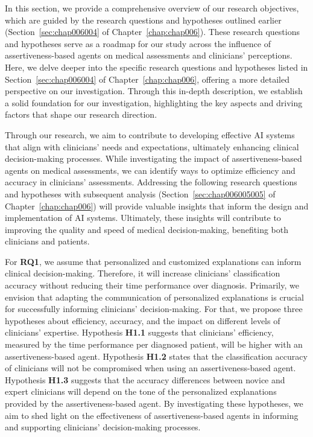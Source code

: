 In this section, we provide a comprehensive overview of our research objectives, which are guided by the research questions and hypotheses outlined earlier (Section~\ref{sec:chap006004} of Chapter~\ref{chap:chap006}).
These research questions and hypotheses serve as a roadmap for our study across the influence of assertiveness-based agents on medical assessments and clinicians' perceptions.
Here, we delve deeper into the specific research questions and hypotheses listed in Section~\ref{sec:chap006004} of Chapter~\ref{chap:chap006}, offering a more detailed perspective on our investigation.
Through this in-depth description, we establish a solid foundation for our investigation, highlighting the key aspects and driving factors that shape our research direction.

Through our research, we aim to contribute to developing effective \ac{AI} systems that align with clinicians' needs and expectations, ultimately enhancing clinical decision-making processes.
While investigating the impact of assertiveness-based agents on medical assessments, we can identify ways to optimize efficiency and accuracy in clinicians' assessments.
Addressing the following research questions and hypotheses with subsequent analysis (Section~\ref{sec:chap006005005} of Chapter~\ref{chap:chap006}) will provide valuable insights that inform the design and implementation of \ac{AI} systems.
Ultimately, these insights will contribute to improving the quality and speed of medical decision-making, benefiting both clinicians and patients.

For {\bf RQ1}, we assume that personalized and customized explanations can inform clinical decision-making.
Therefore, it will increase clinicians' classification accuracy without reducing their time performance over diagnosis.
Primarily, we envision that adapting the communication of personalized explanations is crucial for successfully informing clinicians' decision-making.
For that, we propose three hypotheses about efficiency, accuracy, and the impact on different levels of clinicians' expertise.
Hypothesis {\bf H1.1} suggests that clinicians' efficiency, measured by the time performance per diagnosed patient, will be higher with an assertiveness-based agent.
Hypothesis {\bf H1.2} states that the classification accuracy of clinicians will not be compromised when using an assertiveness-based agent.
Hypothesis {\bf H1.3} suggests that the accuracy differences between novice and expert clinicians will depend on the tone of the personalized explanations provided by the assertiveness-based agent.
By investigating these hypotheses, we aim to shed light on the effectiveness of assertiveness-based agents in informing and supporting clinicians' decision-making processes.

